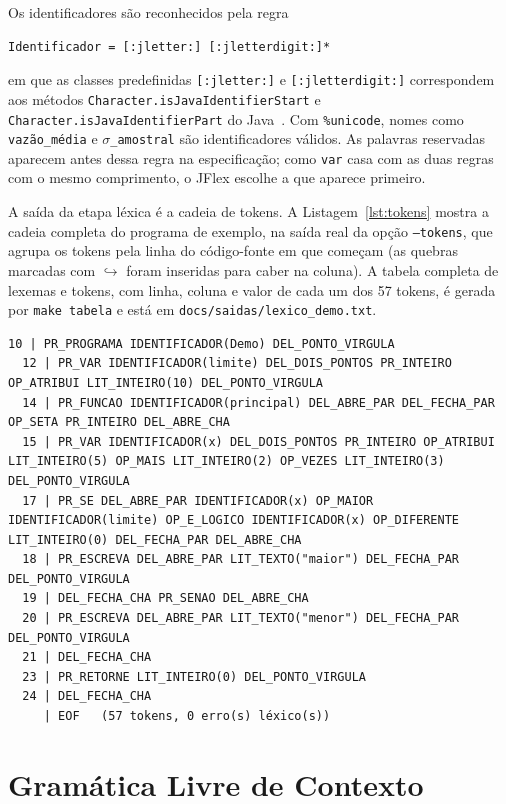 \documentclass[conference,a4paper]{IEEEtran}
\newcommand{\cod}[1]{\texttt{#1}}
\begin{document}
Os identificadores são reconhecidos pela regra
\begin{lstlisting}
Identificador = [:jletter:] [:jletterdigit:]*
\end{lstlisting}
em que as classes predefinidas \cod{[:jletter:]} e \cod{[:jletterdigit:]} correspondem aos métodos \cod{Character.isJavaIdentifierStart} e \cod{Character.isJavaIdentifierPart} do Java~\cite{jflexmanual}. Com \cod{\%unicode}, nomes como \cod{vazão\_média} e \cod{$\sigma$\_amostral} são identificadores válidos. As palavras reservadas aparecem antes dessa regra na especificação; como \cod{var} casa com as duas regras com o mesmo comprimento, o JFlex escolhe a que aparece primeiro.

A saída da etapa léxica é a cadeia de tokens. A Listagem~\ref{lst:tokens} mostra a cadeia completa do programa de exemplo, na saída real da opção \cod{--tokens}, que agrupa os tokens pela linha do código-fonte em que começam (as quebras marcadas com $\hookrightarrow$ foram inseridas para caber na coluna). A tabela completa de lexemas e tokens, com linha, coluna e valor de cada um dos 57 tokens, é gerada por \cod{make tabela} e está em \cod{docs/saidas/lexico\_demo.txt}.

\begin{lstlisting}[float=tb,style=saida,caption={Cadeia de tokens do programa de exemplo (saída real)},label={lst:tokens}]
  10 | PR_PROGRAMA IDENTIFICADOR(Demo) DEL_PONTO_VIRGULA
  12 | PR_VAR IDENTIFICADOR(limite) DEL_DOIS_PONTOS PR_INTEIRO OP_ATRIBUI LIT_INTEIRO(10) DEL_PONTO_VIRGULA
  14 | PR_FUNCAO IDENTIFICADOR(principal) DEL_ABRE_PAR DEL_FECHA_PAR OP_SETA PR_INTEIRO DEL_ABRE_CHA
  15 | PR_VAR IDENTIFICADOR(x) DEL_DOIS_PONTOS PR_INTEIRO OP_ATRIBUI LIT_INTEIRO(5) OP_MAIS LIT_INTEIRO(2) OP_VEZES LIT_INTEIRO(3) DEL_PONTO_VIRGULA
  17 | PR_SE DEL_ABRE_PAR IDENTIFICADOR(x) OP_MAIOR IDENTIFICADOR(limite) OP_E_LOGICO IDENTIFICADOR(x) OP_DIFERENTE LIT_INTEIRO(0) DEL_FECHA_PAR DEL_ABRE_CHA
  18 | PR_ESCREVA DEL_ABRE_PAR LIT_TEXTO("maior") DEL_FECHA_PAR DEL_PONTO_VIRGULA
  19 | DEL_FECHA_CHA PR_SENAO DEL_ABRE_CHA
  20 | PR_ESCREVA DEL_ABRE_PAR LIT_TEXTO("menor") DEL_FECHA_PAR DEL_PONTO_VIRGULA
  21 | DEL_FECHA_CHA
  23 | PR_RETORNE LIT_INTEIRO(0) DEL_PONTO_VIRGULA
  24 | DEL_FECHA_CHA
     | EOF   (57 tokens, 0 erro(s) léxico(s))
\end{lstlisting}

\section{Gramática Livre de Contexto}
\end{document}

